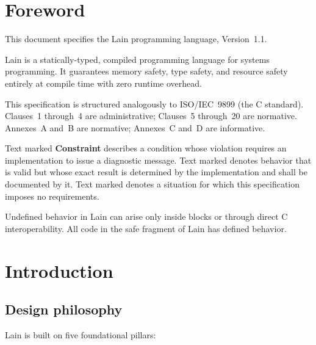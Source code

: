 
\chapter*{Foreword}

This document specifies the Lain programming language, Version~1.1.

Lain is a statically-typed, compiled programming language for systems
programming.  It guarantees memory safety, type safety, and resource safety
entirely at compile time with zero runtime overhead.

This specification is structured analogously to ISO/IEC~9899 (the C
standard).  Clauses~1 through~4 are administrative; Clauses~5 through~20
are normative.  Annexes~A and~B are normative; Annexes~C and~D are
informative.

Text marked \textbf{Constraint} describes a condition whose violation
requires an implementation to issue a diagnostic message.  Text marked
\idbehav{} denotes behavior that is valid but whose exact result is
determined by the implementation and shall be documented by it.  Text
marked \undefbehav{} denotes a situation for which this specification
imposes no requirements.

\begin{note}
  Undefined behavior in Lain can arise only inside  blocks or
  through direct C interoperability.  All code in the safe fragment of Lain
  has defined behavior.
\end{note}

\chapter*{Introduction}

\section*{Design philosophy}

Lain is built on five foundational pillars:

